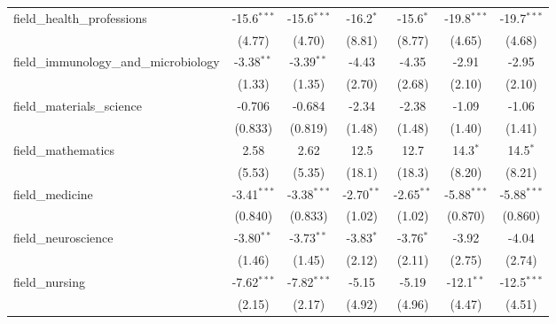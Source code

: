\begin{tabular}{lcccccc}
   field\_health\_professions                                  & -15.6$^{***}$ & -15.6$^{***}$ & -16.2$^{*}$  & -15.6$^{*}$   & -19.8$^{***}$  & -19.7$^{***}$\\   
                                                               & (4.77)        & (4.70)        & (8.81)       & (8.77)        & (4.65)         & (4.68)\\   
   field\_immunology\_and\_microbiology                        & -3.38$^{**}$  & -3.39$^{**}$  & -4.43        & -4.35         & -2.91          & -2.95\\   
                                                               & (1.33)        & (1.35)        & (2.70)       & (2.68)        & (2.10)         & (2.10)\\   
   field\_materials\_science                                   & -0.706        & -0.684        & -2.34        & -2.38         & -1.09          & -1.06\\   
                                                               & (0.833)       & (0.819)       & (1.48)       & (1.48)        & (1.40)         & (1.41)\\   
   field\_mathematics                                          & 2.58          & 2.62          & 12.5         & 12.7          & 14.3$^{*}$     & 14.5$^{*}$\\   
                                                               & (5.53)        & (5.35)        & (18.1)       & (18.3)        & (8.20)         & (8.21)\\   
   field\_medicine                                             & -3.41$^{***}$ & -3.38$^{***}$ & -2.70$^{**}$ & -2.65$^{**}$  & -5.88$^{***}$  & -5.88$^{***}$\\   
                                                               & (0.840)       & (0.833)       & (1.02)       & (1.02)        & (0.870)        & (0.860)\\   
   field\_neuroscience                                         & -3.80$^{**}$  & -3.73$^{**}$  & -3.83$^{*}$  & -3.76$^{*}$   & -3.92          & -4.04\\   
                                                               & (1.46)        & (1.45)        & (2.12)       & (2.11)        & (2.75)         & (2.74)\\   
   field\_nursing                                              & -7.62$^{***}$ & -7.82$^{***}$ & -5.15        & -5.19         & -12.1$^{**}$   & -12.5$^{***}$\\   
                                                               & (2.15)        & (2.17)        & (4.92)       & (4.96)        & (4.47)         & (4.51)\\   

\end{tabular}
